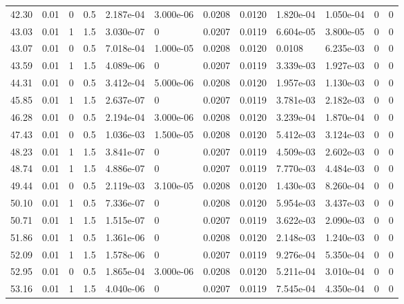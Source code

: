 \documentclass[preview]{standalone}
\begin{document}
{{{\begin{tabular}{L{1.2cm}C{1.2cm} C{0.3cm}C{0.5cm} C{1.4cm}C{1.4cm} C{1.4cm}C{1.4cm} C{1.6cm}C{1.6cm} C{1.6cm}C{1.6cm}}
  42.30  &  0.01  & 0     & 0.5 &  2.187e-04  & 3.000e-06  &  0.0208&   0.0120& 1.820e-04 & 1.050e-04   &  0 & 0  \\ 
  43.03  &  0.01  & 1     & 1.5 &  3.030e-07  & 0  &  0.0207&   0.0119& 6.604e-05 & 3.800e-05   &  0 & 0  \\ 
  43.07  &  0.01  & 0     & 0.5 &  7.018e-04  & 1.000e-05  &  0.0208&   0.0120& 0.0108 & 6.235e-03   &  0 & 0  \\ 
  43.59  &  0.01  & 1     & 1.5 &  4.089e-06  & 0  &  0.0207&   0.0119& 3.339e-03 & 1.927e-03   &  0 & 0  \\ 
  44.31  &  0.01  & 0     & 0.5 &  3.412e-04  & 5.000e-06  &  0.0208&   0.0120& 1.957e-03 & 1.130e-03   &  0 & 0  \\ 
  45.85  &  0.01  & 1     & 1.5 &  2.637e-07  & 0  &  0.0207&   0.0119& 3.781e-03 & 2.182e-03   &  0 & 0  \\ 
  46.28  &  0.01  & 0     & 0.5 &  2.194e-04  & 3.000e-06  &  0.0208&   0.0120& 3.239e-04 & 1.870e-04   &  0 & 0  \\ 
  47.43  &  0.01  & 0     & 0.5 &  1.036e-03  & 1.500e-05  &  0.0208&   0.0120& 5.412e-03 & 3.124e-03   &  0 & 0  \\ 
  48.23  &  0.01  & 1     & 1.5 &  3.841e-07  & 0  &  0.0207&   0.0119& 4.509e-03 & 2.602e-03   &  0 & 0  \\ 
  48.74  &  0.01  & 1     & 1.5 &  4.886e-07  & 0  &  0.0207&   0.0119& 7.770e-03 & 4.484e-03   &  0 & 0  \\ 
  49.44  &  0.01  & 0     & 0.5 &  2.119e-03  & 3.100e-05  &  0.0208&   0.0120& 1.430e-03 & 8.260e-04   &  0 & 0  \\ 
  50.10  &  0.01  & 1     & 0.5 &  7.336e-07  & 0  &  0.0208&   0.0120& 5.954e-03 & 3.437e-03   &  0 & 0  \\ 
  50.71  &  0.01  & 1     & 1.5 &  1.515e-07  & 0  &  0.0207&   0.0119& 3.622e-03 & 2.090e-03   &  0 & 0  \\ 
  51.86  &  0.01  & 1     & 0.5 &  1.361e-06  & 0  &  0.0208&   0.0120& 2.148e-03 & 1.240e-03   &  0 & 0  \\ 
  52.09  &  0.01  & 1     & 1.5 &  1.578e-06  & 0  &  0.0207&   0.0119& 9.276e-04 & 5.350e-04   &  0 & 0  \\ 
  52.95  &  0.01  & 0     & 0.5 &  1.865e-04  & 3.000e-06  &  0.0208&   0.0120& 5.211e-04 & 3.010e-04   &  0 & 0  \\ 
  53.16  &  0.01  & 1     & 1.5 &  4.040e-06  & 0  &  0.0207&   0.0119& 7.545e-04 & 4.350e-04   &  0 & 0  \\ 

\end{tabular}}}}
\end{document}
